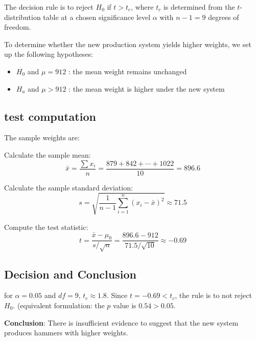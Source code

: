 The decision rule is to reject $H_{0}$ if $t>t_{c}$, where $ t_{c} $ is determined from the $ t $-distribution table at a chosen significance level $\alpha$ with $ n-1 = 9 $ degrees of freedom.

To determine whether the new production system yields higher weights, we set up the following hypotheses:
\begin{itemize}
\item $H_{0}$ and $\mu = 912$ : the mean weight remains unchanged
\item $H_{a}$ and $\mu > 912$ :  the mean weight is higher under the new system
\end{itemize}


\subsection{test computation}
The sample weights are:
\begin{equation}
[879, 842, 954, 842, 885, 918, 989, 768, 867, 1022]
\end{equation}

Calculate the sample mean:
\begin{equation}
\bar{x} = \frac{\sum x_i}{n} = \frac{879 + 842 + \cdots + 1022}{10} = 896.6
\end{equation}

Calculate the sample standard deviation:
\begin{equation}
s = \sqrt{\frac{1}{n-1} \sum_{i=1}^n (x_i - \bar{x})^2} \approx 71.5
\end{equation}

Compute the test statistic:
\begin{equation}
t = \frac{\bar{x} - \mu_0}{s / \sqrt{n}} = \frac{896.6 - 912}{71.5 / \sqrt{10}} \approx -0.69
\end{equation}

\subsection*{Decision and Conclusion}
for $\alpha = 0.05$ and $df = 9$, $t_{c} \approx 1.8$. Since $t = -0.69 < t_{c}$, the rule is to not reject $H_{0}$. (equivalent formulation: the $p$ value is $0.54>0.05$.

\textbf{Conclusion}: There is insufficient evidence to suggest that the new system produces hammers with higher weights.
